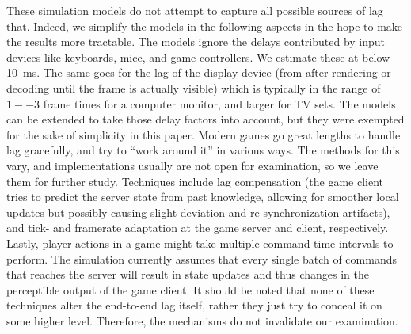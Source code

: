 These simulation models do not attempt to capture all possible sources of lag that. Indeed, we simplify the models in the following aspects in the hope to make the results more tractable. The models ignore the delays contributed by input devices like keyboards, mice, and game controllers. We estimate these at below \SI{10}{\milli\second}. The same goes for the lag of the display device (from after rendering or decoding until the frame is actually visible) which is typically in the range of $1--3$ frame times for a computer monitor, and larger for TV sets. The models can be extended to take those delay factors into account, but they were exempted for the sake of simplicity in this paper. Modern games go great lengths to handle lag gracefully, and try to ``work around it'' in various ways. The methods for this vary, and implementations usually are not open for examination, so we leave them for further study. Techniques include lag compensation (the game client tries to predict the server state from past knowledge, allowing for smoother local updates but possibly causing slight deviation and re-synchronization artifacts), and tick- and framerate adaptation at the game server and client, respectively. Lastly, player actions in a game might take multiple command time intervals to perform. The simulation currently assumes that every single batch of commands that reaches the server will result in state updates and thus changes in the perceptible output of the game client. It should be noted that none of these techniques alter the end-to-end lag itself, rather they just try to conceal it on some higher level. Therefore, the mechanisms do not invalidate our examination.



